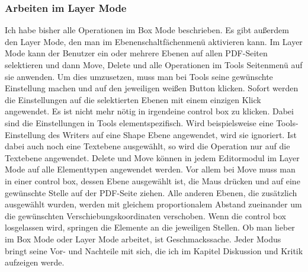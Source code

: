 \subsubsection{Arbeiten im Layer Mode}
Ich habe bisher alle Operationen im Box Mode beschrieben. Es gibt außerdem den Layer Mode, den man im Ebenenschaltfächenmenü aktivieren kann. Im Layer Mode kann der Benutzer ein oder mehrere Ebenen auf allen PDF-Seiten selektieren und dann Move, Delete und alle Operationen im Tools Seitenmenü auf sie anwenden. Um dies umzusetzen, muss man bei Tools seine gewünschte Einstellung machen und auf den jeweiligen weißen Button klicken. Sofort werden die Einstellungen auf die selektierten Ebenen mit einem einzigen Klick angewendet. Es ist nicht mehr nötig in irgendeine control box zu klicken. Dabei sind die Einstellungen in Tools elementspezifisch. Wird beispielsweise eine Tools-Einstellung des Writers auf eine Shape Ebene angewendet, wird sie ignoriert. Ist dabei auch noch eine Textebene ausgewählt, so wird die Operation nur auf die Textebene angewendet. Delete und Move können in jedem Editormodul im Layer Mode auf alle Elementtypen angewendet werden. Vor allem bei Move muss man in einer control box, dessen Ebene ausgewählt ist, die Maus drücken und auf eine gewünschte Stelle auf der PDF-Seite ziehen. Alle anderen Ebenen, die zusätzlich ausgewählt wurden, werden mit gleichem proportionalem Abstand zueinander um die gewünschten Verschiebungskoordinaten verschoben. Wenn die control box losgelassen wird, springen die Elemente an die jeweiligen Stellen. Ob man lieber im Box Mode oder Layer Mode arbeitet, ist Geschmackssache. Jeder Modus bringt seine Vor- und Nachteile mit sich, die ich im Kapitel Diskussion und Kritik aufzeigen werde.